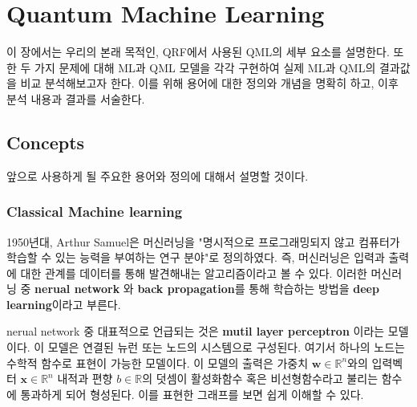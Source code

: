 


%
%



%
%
\section{Quantum Machine Learning}

 이 장에서는 우리의 본래 목적인, QRF에서 사용된 QML의 세부 요소를 설명한다. 또한 두 가지 문제에 대해 ML과 QML 모델을 각각 구현하여 실제 ML과 QML의 결과값을 비교 분석해보고자 한다. 이를 위해 용어에 대한 정의와 개념을 명확히 하고, 이후 분석 내용과 결과를 서술한다.
 \subsection{Concepts} \label{qml:concepts}

 앞으로 사용하게 될 주요한 용어와 정의에 대해서 설명할 것이다.

\subsubsection{Classical Machine learning} 1950년대, Arthur Samuel은 머신러닝을 "명시적으로 프로그래밍되지 않고 컴퓨터가 학습할 수 있는 능력을 부여하는 연구 분야"로 정의하였다\citep{schuld2015introduction}. 즉, 머신러닝은 입력과 출력에 대한 관계를 데이터를 통해 발견해내는 알고리즘이라고 볼 수 있다. 이러한 머신러닝 중 \textbf{nerual network} 와 \textbf{back propagation}를 통해 학습하는 방법을 \textbf{deep learning}이라고 부른다.

nerual network 중 대표적으로 언급되는 것은 \textbf{mutil layer perceptron} 이라는 모델이다. 이 모델은 연결된 뉴런 또는 노드의 시스템으로 구성된다.\cite{gardner1998artificial} 여기서 하나의 노드는 수학적 함수로 표현이 가능한 모델이다. 이 모델의 출력은 가중치 $\mathbf{w} \in \mathbb{R}^n $와의 입력벡터 $\mathbf{x} \in \mathbb{R}^n $ 내적과 편향 $b \in \mathbb{R}$의 덧셈이 활성화함수 혹은 비선형함수라고 불리는 함수에 통과하게 되어 형성된다.\cite{krenker2011introduction}
이를 표현한 그래프를 보면 쉽게 이해할 수 있다. %

